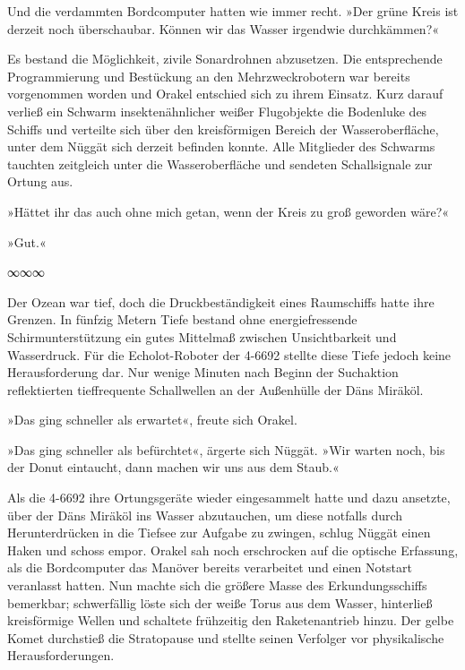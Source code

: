 Und die verdammten Bordcomputer hatten wie immer recht. »Der grüne Kreis ist derzeit noch überschaubar. Können wir das Wasser irgendwie durchkämmen?«

Es bestand die Möglichkeit, zivile Sonardrohnen abzusetzen. Die entsprechende Programmierung und Bestückung an den Mehrzweckrobotern war bereits vorgenommen worden und Orakel entschied sich zu ihrem Einsatz. Kurz darauf verließ ein Schwarm insektenähnlicher weißer Flugobjekte die Bodenluke des Schiffs und verteilte sich über den kreisförmigen Bereich der Wasseroberfläche, unter dem Nüggät sich derzeit befinden konnte. Alle Mitglieder des Schwarms tauchten zeitgleich unter die Wasseroberfläche und sendeten Schallsignale zur Ortung aus.

»Hättet ihr das auch ohne mich getan, wenn der Kreis zu groß geworden wäre?«


»Gut.«

\begin{center}
∞∞∞
\end{center}

Der Ozean war tief, doch die Druckbeständigkeit eines Raumschiffs hatte ihre Grenzen. In fünfzig Metern Tiefe bestand ohne energiefressende Schirmunterstützung ein gutes Mittelmaß zwischen Unsichtbarkeit und Wasserdruck. Für die Echolot-Roboter der 4-6692 stellte diese Tiefe jedoch keine Herausforderung dar. Nur wenige Minuten nach Beginn der Suchaktion reflektierten tieffrequente Schallwellen an der Außenhülle der Däns Miräköl.

»Das ging schneller als erwartet«, freute sich Orakel.

»Das ging schneller als befürchtet«, ärgerte sich Nüggät. »Wir warten noch, bis der Donut eintaucht, dann machen wir uns aus dem Staub.«

Als die 4-6692 ihre Ortungsgeräte wieder eingesammelt hatte und dazu ansetzte, über der Däns Miräköl ins Wasser abzutauchen, um diese notfalls durch Herunterdrücken in die Tiefsee zur Aufgabe zu zwingen, schlug Nüggät einen Haken und schoss empor. Orakel sah noch erschrocken auf die optische Erfassung, als die Bordcomputer das Manöver bereits verarbeitet und einen Notstart veranlasst hatten. Nun machte sich die größere Masse des Erkundungsschiffs bemerkbar; schwerfällig löste sich der weiße Torus aus dem Wasser, hinterließ kreisförmige Wellen und schaltete frühzeitig den Raketenantrieb hinzu. Der gelbe Komet durchstieß die Stratopause und stellte seinen Verfolger vor physikalische Herausforderungen.

